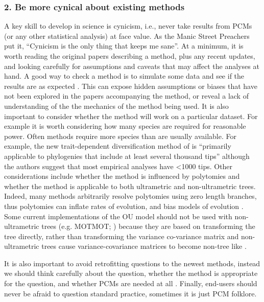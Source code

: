 \documentclass[a4paper,12pt]{article}
\begin{document}
  \subsubsection{2. Be more cynical about existing methods}
    A key skill to develop in science is cynicism, i.e., never take results from PCMs (or any other statistical analysis) at face value.
    As the Manic Street Preachers put it, ``Cynicism is the only thing that keeps me sane''.
    At a minimum, it is worth reading the original papers describing a method, plus any recent updates, and looking carefully for assumptions and caveats that may affect the analyses at hand.
    A good way to check a method is to simulate some data and see if the results are as expected \citep[e.g.][]{boettiger2012your}. 
    This can expose hidden assumptions or biases that have not been explored in the papers accompanying the method, or reveal a lack of understanding of the the mechanics of the method being used. 
    It is also important to consider whether the method will work on a particular dataset.
    For example it is worth considering how many species are required for reasonable power. 
    Often methods require more species than are usually  available. For example, the new trait-dependent diversification method of \citet{rabosky2015robust} is ``primarily applicable to phylogenies that include at least several thousand tips'' although the authors suggest that most empirical analyses have \textless 1000 tips. 
    Other considerations include whether the method is influenced by polytomies and whether the method is applicable to both ultrametric and non-ultrametric trees. 
    Indeed, many methods arbitrarily resolve polytomies using zero length branches, thus polytomies can inflate rates of evolution, and bias models of evolution  \citep{cooper2010body}. 
    Some current implementations of the OU model should not be used with non-ultrametric trees (e.g. MOTMOT; \citealp{Thomas:2011aa}) because they are based on transforming the tree directly, rather than transforming the variance co-variance matrix and non-ultrametric trees cause variance-covariance matrices to become non-tree like \citep{slater2014correction}.


    It is also important to avoid retrofitting questions to the newest methods, instead we should think carefully about the question, whether the method is appropriate for the question, and whether PCMs are needed at all \citep{westoby1995misinterpreting,losos2011seeing}.
    Finally, end-users should never be afraid to question standard practice, sometimes it is just PCM folklore.
\end{document}
